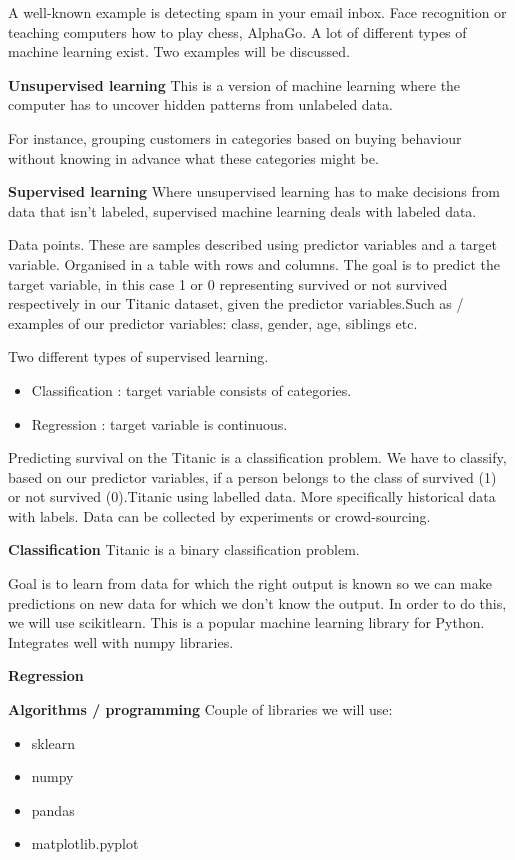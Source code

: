 \documentclass[11pt]{article}
\begin{document}
A well-known example is detecting spam in your email inbox. Face recognition or teaching computers how to play chess, AlphaGo. A lot of different types of machine learning exist. Two examples will be discussed. 


\textbf{Unsupervised learning}
This is a version of machine learning where the computer has to uncover hidden patterns from unlabeled data. 

For instance, grouping customers in categories based on buying behaviour without knowing in advance what these categories might be. 

\textbf{Supervised learning}
Where unsupervised learning has to make decisions from data that isn't labeled, supervised machine learning deals with labeled data. 

Data points. These are samples described using predictor variables and a target variable. Organised in a table with rows and columns. 
The goal is to predict the target variable, in this case 1 or 0 representing survived or not survived respectively in our Titanic dataset, given the predictor variables.Such as / examples of our predictor variables: class, gender, age, siblings etc. 

Two different types of supervised learning. 
\begin{itemize}
\item Classification : target variable consists of categories.
\item Regression : target variable is continuous.
\end{itemize}

Predicting survival on the Titanic is a classification problem. We have to classify, based on our predictor variables, if a person belongs to the class of survived (1) or not survived (0).Titanic using labelled data. More specifically historical data with labels. Data can be collected by experiments or crowd-sourcing. 

\textbf{Classification}
Titanic is a binary classification problem. 



Goal is to learn from data for which the right output is known so we can make predictions on new data for which we don't know the output. In order to do this, we will use scikitlearn. This is a popular machine learning library for Python. Integrates well with numpy libraries.

\textbf{Regression}

\textbf{Algorithms / programming}
Couple of libraries we will use: 
\begin{itemize}
\item sklearn
\item numpy
\item pandas
\item matplotlib.pyplot
\end{itemize}
\end{document}
